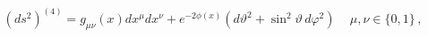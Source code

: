 \begin{equation}
(ds^2)^{(4)} = g_{\mu\nu}(x) dx^\mu dx^\nu +
e^{-2\phi(x)} (d\vartheta^2 +
\sin^2 \vartheta \, d\varphi^2)\, \quad \mu,\nu \in \{0,1\}\, ,
\end{equation}

